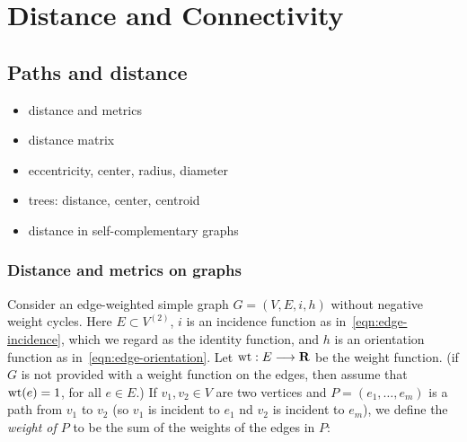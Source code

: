 
\chapter{Distance and Connectivity}
\label{chap:distance_connectivity}



\section{Paths and distance}

\begin{itemize}
\item distance and metrics

\item distance matrix

\item eccentricity, center, radius, diameter

\item trees: distance, center, centroid

\item distance in self-complementary graphs
\end{itemize}



\subsection{Distance and metrics on graphs}

Consider an edge-weighted simple
graph $G=(V,E,i,h)$ without negative weight
cycles. Here $E\subset V^{(2)}$,
$i$ is an incidence function as in~\eqref{eqn:edge-incidence}, which
we regard as the identity function, and $h$ is an
orientation function as in~\eqref{eqn:edge-orientation}.
Let ${\rm wt}: E \longrightarrow \mathbf{R}$ be the weight function.
(if $G$ is not provided with a weight function on the edges,
then assume that ${\rm wt}(e)=1$, for all $e\in E$.)
If $v_1,v_2\in V$ are two vertices and $P=(e_1,\dots,e_m)$ is
a path from $v_1$ to $v_2$ (so $v_1$ is incident to $e_1$
nd $v_2$ is incident to $e_m$), we define the {\it weight of $P$}
to be the sum of the weights of the edges in $P$:

